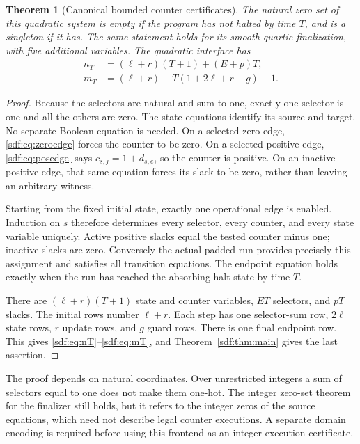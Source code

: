 \documentclass[11pt,a4paper]{article}
\newtheorem{theorem}{Theorem}[section]
\theoremstyle{definition}
\theoremstyle{remark}
\begin{document}
\begin{theorem}[Canonical bounded counter certificates]\label{sdf:thm:counter}
The natural zero set of this quadratic system is empty if the program has
not halted by time $T$, and is a singleton if it has. The same statement
holds for its smooth quartic finalization, with five additional variables.
The quadratic interface has
\begin{align}
 n_T&=(\ell+r)(T+1)+(E+p)T,\label{sdf:eq:nT}\\
 m_T&=(\ell+r)+T(1+2\ell+r+g)+1.\label{sdf:eq:mT}
\end{align}
\end{theorem}
\begin{proof}
Because the selectors are natural and sum to one, exactly one selector is
one and all the others are zero. The state equations identify its source
and target. No separate Boolean equation is needed. On a selected zero
edge, \eqref{sdf:eq:zeroedge} forces the counter to be zero. On a selected
positive edge, \eqref{sdf:eq:posedge} says $c_{s,j}=1+d_{s,e}$, so the
counter is positive. On an inactive positive edge, that same equation
forces its slack to be zero, rather than leaving an arbitrary witness.

Starting from the fixed initial state, exactly one operational edge is
enabled. Induction on $s$ therefore determines every selector, every
counter, and every state variable uniquely. Active positive slacks equal
the tested counter minus one; inactive slacks are zero. Conversely the
actual padded run provides precisely this assignment and satisfies all
transition equations. The endpoint equation holds exactly when the run
has reached the absorbing halt state by time $T$.

There are $(\ell+r)(T+1)$ state and counter variables, $ET$ selectors,
and $pT$ slacks. The initial rows number $\ell+r$. Each step has one
selector-sum row, $2\ell$ state rows, $r$ update rows, and $g$ guard
rows. There is one final endpoint row. This gives
\eqref{sdf:eq:nT}--\eqref{sdf:eq:mT}, and Theorem~\ref{sdf:thm:main} gives the
last assertion.
\end{proof}

The proof depends on natural coordinates. Over unrestricted integers a sum
of selectors equal to one does not make them one-hot. The integer
zero-set theorem for the finalizer still holds, but it refers to the
integer zeros of the source equations, which need not describe legal
counter executions. A separate domain encoding is required before using
this frontend as an integer execution certificate.
\end{document}

